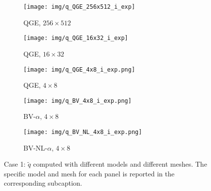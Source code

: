 \documentclass[11pt,a4paper]{article}
\begin{document}
\begin{figure}[htb!]
\centering
\begin{subfigure}{0.193\textwidth}
         \centering
         \texttt{[image: img/q\_QGE\_256x512\_i\_exp]}
         \caption{\scriptsize{QGE, $256\times512$}}
     \end{subfigure}
\begin{subfigure}{0.193\textwidth}
         \centering
         \texttt{[image: img/q\_QGE\_16x32\_i\_exp]}
         \caption{\scriptsize{QGE, $16 \times 32$}}
     \end{subfigure}
\begin{subfigure}{0.193\textwidth}
         \centering
         \texttt{[image: img/q\_QGE\_4x8\_i\_exp.png]}
         \caption{\scriptsize{QGE, $4 \times 8$}}
     \end{subfigure}
\begin{subfigure}{0.193\textwidth}
         \centering
         \texttt{[image: img/q\_BV\_4x8\_i\_exp.png]}
         \caption{\scriptsize{BV-$\alpha$, $4 \times 8$}}
     \end{subfigure}
\begin{subfigure}{0.193\textwidth}
         \centering
         \texttt{[image: img/q\_BV\_NL\_4x8\_i\_exp.png]}
         \caption{\scriptsize{BV-NL-$\alpha$, $4 \times 8$}}
     \end{subfigure}
\caption{Case 1:  $\widetilde{q}$ computed with different models and different meshes. 
The specific model and mesh for each panel is reported in the corresponding subcaption.
}
\label{fig:q_first}
\end{figure}
\end{document}
